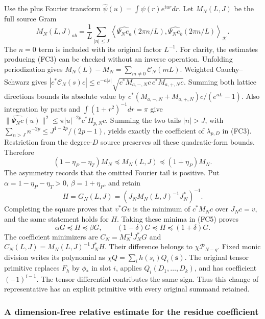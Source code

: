 Use the plus Fourier transform $\widehat\psi(u)=\int\psi(r)e^{iur}dr$.
Let $M_N(L,J)$ be the full source Gram
\[
 M_N(L,J)_{ab}=\frac1L\sum_{|n|\le J}
 \left\langle\widehat{\Psi_N e_a}(2\pi n/L),
                  \widehat{\Psi_N e_b}(2\pi n/L)\right\rangle_{\mathcal K}.
 \tag{FC4}
\]
The $n=0$ term is included with its original factor $L^{-1}$.
For clarity, the estimates producing (FC3) can be checked without an
inverse operation. Unfolding periodization gives
$M_N(L)-M_N=\sum_{m\ne0}\mathcal C_N(mL)$. Weighted Cauchy--Schwarz gives
$|c^*\mathcal C_N(s)c|\le e^{-a|s|}
\sqrt{c^*M_{a,-,N}c\,c^*M_{a,+,N}c}$.
Summing both lattice directions bounds its absolute value by
$c^*(M_{a,-,N}+M_{a,+,N})c/(e^{aL}-1)$.
Also integration by parts and $\int(1+r^2)^{-1}dr=\pi$ give
$\|\widehat{\Psi_Nc}(u)\|^2\le\pi|u|^{-2p}c^*H_{p,N}c$.
Summing the two tails $|n|>J$, with
$\sum_{n>J}n^{-2p}\le J^{1-2p}/(2p-1)$, yields exactly
the coefficient of $\lambda_{p,D}$ in (FC3). Restriction from the
degree-$D$ source preserves all these quadratic-form bounds. Therefore
\[
 (1-\eta_P-\eta_T)M_N\preceq M_N(L,J)
       \preceq(1+\eta_P)M_N.
 \tag{FC5}
\]
The asymmetry records that the omitted Fourier tail is positive.
Put $\alpha=1-\eta_P-\eta_T>0$, $\beta=1+\eta_P$, and retain
\[
 H=G_N(L,J)=(J_NM_N(L,J)^{-1}J_N^*)^{-1}.
 \tag{FC6}
\]
Completing the square proves that $v^*Gv$ is the minimum of $c^*M_Nc$
over $J_Nc=v$, and the same statement holds for $H$. Taking these
minima in (FC5) proves
\[
 \alpha G\preceq H\preceq\beta G,
 \qquad (1-\delta)G\preceq H\preceq(1+\delta)G.
 \tag{FC7}
\]
The coefficient minimizers are $C_N=M_N^{-1}J_N^*G$ and
$C_N(L,J)=M_N(L,J)^{-1}J_N^*H$. Their difference belongs to
$\chi\mathcal P_{N-q}$. Fixed monic division writes its polynomial
as $\chi Q=\sum_i h(s_i)Q_i(\mathbf s)$. The original tensor primitive
replaces $F_h$ by $\phi_*$ in slot $i$, applies $Q_i(D_1,\ldots,D_k)$,
and has coefficient $(-1)^{i-1}$. The tensor differential contributes
the same sign. Thus this change of representative has an explicit
primitive with every original summand retained.

\subsubsection{A dimension-free relative estimate for the residue coefficient}

